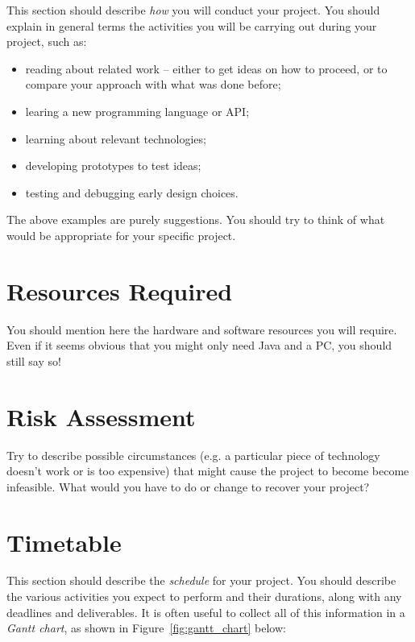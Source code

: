 \documentclass[a4paper,12pt]{article}
\begin{document}
This section should describe {\em how} you will conduct
your project. You should explain in general terms
the activities you will be carrying out during your project, such as:
%
\begin{itemize}
\item reading about related work -- either to get ideas on how to
      proceed, or to compare your approach with what was done before;
\item learing a new programming language or API;
\item learning about relevant technologies;
\item developing prototypes to test ideas;
\item testing and debugging early design choices.
\end{itemize}
%
The above examples are purely suggestions. You should try to think
of what would be appropriate for your specific project.

\section*{Resources Required}

You should mention here the hardware and software resources you will
require. Even if it seems obvious that you might only need Java and a PC, 
you should still say so!


\section*{Risk Assessment}

Try to describe possible circumstances (e.g. a particular piece of
technology doesn't work or is too expensive) that might cause
the project to become become infeasible. What would you have to do
or change to recover your project?

\section*{Timetable}

This section should describe the {\em schedule} for your project. 
You should describe the various activities you expect to perform
and their durations, along with any deadlines and deliverables.
It is often useful to collect all of this information in a
{\em Gantt chart}, as shown in Figure~\ref{fig:gantt_chart} below:
\end{document}
